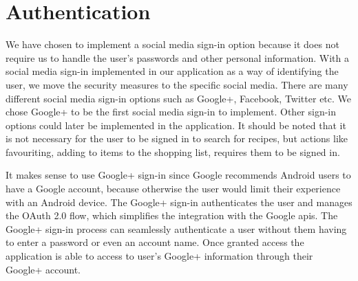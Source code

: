 \section{Authentication}
We have chosen to implement a social media sign-in option because it does not require us to handle the user's passwords and other personal information. With a social media sign-in implemented in our application as a way of identifying the user, we move the security measures to the specific social media.
There are many different social media sign-in options such as Google+, Facebook, Twitter etc. We chose Google+ to be the first social media sign-in to implement. Other sign-in options could later be implemented in the application. It should be noted that it is not necessary for the user to be signed in to search for recipes, but actions like favouriting, adding to items to the shopping list, requires them to be signed in.

It makes sense to use Google+ sign-in since Google recommends Android users to have a Google account, because otherwise the user would limit their experience with an Android device. 
The Google+ sign-in authenticates the user and manages the OAuth 2.0 flow, which simplifies the integration with the Google \ac{api}s.
The Google+ sign-in process can seamlessly authenticate a user without them having to enter a password or even an account name. 
Once granted access the application is able to access to user's Google+ information through their Google+ account.\cite{googleplusvideo}


